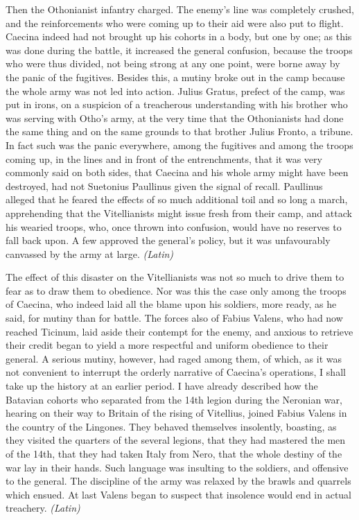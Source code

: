 
Then the Othonianist infantry charged. The enemy's line was completely crushed, and the reinforcements who were coming up to their aid were also put to flight. Caecina indeed had not brought up his cohorts in a body, but one by one; as this was done during the battle, it increased the general confusion, because the troops who were thus divided, not being strong at any one point, were borne away by the panic of the fugitives. Besides this, a mutiny broke out in the camp because the whole army was not led into action. Julius Gratus, prefect of the camp, was put in irons, on a suspicion of a treacherous understanding with his brother who was serving with Otho's army, at the very time that the Othonianists had done the same thing and on the same grounds to that brother Julius Fronto, a tribune. In fact such was the panic everywhere, among the fugitives and among the troops coming up, in the lines and in front of the entrenchments, that it was very commonly said on both sides, that Caecina and his whole army might have been destroyed, had not Suetonius Paullinus given the signal of recall. Paullinus alleged that he feared the effects of so much additional toil and so long a march, apprehending that the Vitellianists might issue fresh from their camp, and attack his wearied troops, who, once thrown into confusion, would have no reserves to fall back upon. A few approved the general's policy, but it was unfavourably canvassed by the army at large. \emph{(Latin)}


The effect of this disaster on the Vitellianists was not so much to drive them to fear as to draw them to obedience. Nor was this the case only among the troops of Caecina, who indeed laid all the blame upon his soldiers, more ready, as he said, for mutiny than for battle. The forces also of Fabius Valens, who had now reached Ticinum, laid aside their contempt for the enemy, and anxious to retrieve their credit began to yield a more respectful and uniform obedience to their general. A serious mutiny, however, had raged among them, of which, as it was not convenient to interrupt the orderly narrative of Caecina's operations, I shall take up the history at an earlier period. I have already described how the Batavian cohorts who separated from the 14th legion during the Neronian war, hearing on their way to Britain of the rising of Vitellius, joined Fabius Valens in the country of the Lingones. They behaved themselves insolently, boasting, as they visited the quarters of the several legions, that they had mastered the men of the 14th, that they had taken Italy from Nero, that the whole destiny of the war lay in their hands. Such language was insulting to the soldiers, and offensive to the general. The discipline of the army was relaxed by the brawls and quarrels which ensued. At last Valens began to suspect that insolence would end in actual treachery. \emph{(Latin)}

